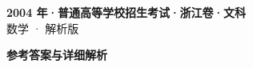 \documentclass[zihao=-4, a4paper]{ctexart}
\begin{document}
\begin{center}
  {\Large\bfseries 2004 年·普通高等学校招生考试·浙江卷·文科}\\[4pt]
  {\large 数学 · 解析版}
\end{center}
\medskip
{}

\clearpage
{}
\begin{center}{\Large\bfseries 参考答案与详细解析}\end{center}
\medskip

\end{document}
